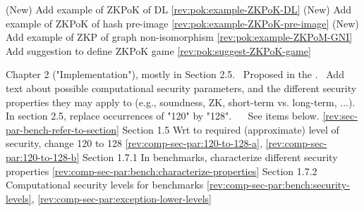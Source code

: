 (New) 
\newcol \newcol \newcol Add example of ZKPoK of DL
\newcol \ref{rev:pok:example-ZKPoK-DL}
\rowendL
(New) 
\newcol \newcol \newcol Add example of ZKPoK of hash pre-image
\newcol \ref{rev:pok:example-ZKPoK-pre-image}
\rowendL
(New) 
\newcol \newcol \newcol Add example of ZKP of graph non-isomorphism
\newcol \ref{rev:pok:example-ZKPoM-GNI}
\rowendL
\newcol \newcol \newcol Add suggestion to define ZKPoK game
\newcol \ref{rev:pok:suggest-ZKPoK-game}
\rowendL
\myendIssue



Chapter 2 ("Implementation"), mostly in Section 2.5.
\newcol \ccontext\ Proposed in the .
				\propContrib\ Add text about possible computational security parameters, and the different security properties they may apply to (e.g., soundness, ZK, short-term vs. long-term, ...). In section 2.5, replace occurrences of "120" by "128".
\newcol {}
\newcol \contributors\ \NISTPECteam
				\Chan\ See items below.
\newcol \ref{rev:sec-par-bench-refer-to-section}
\rowendL
Section 1.5
\newcol \newcol \newcol Wrt to required (approximate) level of security, change 120 to 128
\newcol \ref{rev:comp-sec-par:120-to-128-a}, \ref{rev:comp-sec-par:120-to-128-b}
\rowendL
Section 1.7.1
\newcol \newcol \newcol In benchmarks, characterize different security properties
\newcol \ref{rev:comp-sec-par:bench:characterize-properties}
\rowendL
Section 1.7.2
\newcol \newcol \newcol Computational security levels for benchmarks
\newcol \ref{rev:comp-sec-par:bench:security-levels}, \ref{rev:comp-sec-par:exception-lower-levels}
\rowendL
\myendIssue




